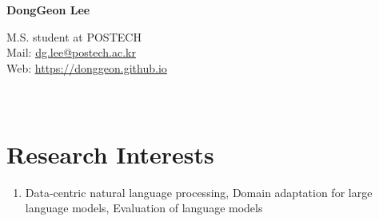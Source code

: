 \documentclass[letterpaper,11pt]{article}
\begin{document}
    \pagestyle{fancy}
    \thispagestyle{fancy}
    
    \begin{center}
        {\LARGE{\bf{DongGeon Lee}}\\}
    \end{center}
    
    \vspace{-14pt}
    
    \begin{center} 
        {M.S. student at POSTECH \\}
        {Mail: \underline{\href{mailto:dg.lee@postech.ac.kr}{dg.lee@postech.ac.kr}} \\}
        {Web: \underline{\href{https://donggeon.github.io/}{https://donggeon.github.io}}}
    \end{center}

    \section{\\Research Interests}
    \begin{enumerate}[noitemsep, leftmargin=*,label={}]
    \item{Data-centric natural language processing, Domain adaptation for large language models, Evaluation of language models}
    \end{enumerate}
    
\end{document}
